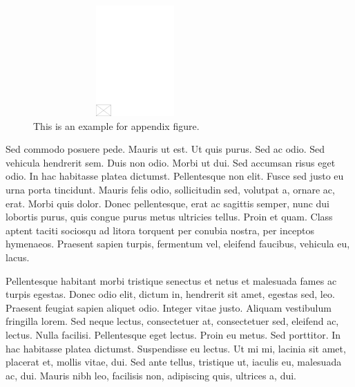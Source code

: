 \documentclass[APA,Times1COL]{WileyNJDv5} %
\begin{document}
\begin{figure}[b]
\centerline{\includegraphics[height=10pc,width=78mm,draft]{empty}}
\caption{This is an example for appendix figure.\label{fig5}}
\end{figure}


Sed commodo posuere pede. Mauris ut est. Ut quis purus. Sed ac odio. Sed vehicula hendrerit sem. Duis non odio.
Morbi ut dui. Sed accumsan risus eget odio. In hac habitasse platea dictumst. Pellentesque non elit. Fusce sed justo
eu urna porta tincidunt. Mauris felis odio, sollicitudin sed, volutpat a, ornare ac, erat. Morbi quis dolor. Donec
pellentesque, erat ac sagittis semper, nunc dui lobortis purus, quis congue purus metus ultricies tellus. Proin et quam.
Class aptent taciti sociosqu ad litora torquent per conubia nostra, per inceptos hymenaeos. Praesent sapien turpis,
fermentum vel, eleifend faucibus, vehicula eu, lacus.

Pellentesque habitant morbi tristique senectus et netus et malesuada fames ac turpis egestas. Donec odio elit,
dictum in, hendrerit sit amet, egestas sed, leo. Praesent feugiat sapien aliquet odio. Integer vitae justo. Aliquam
vestibulum fringilla lorem. Sed neque lectus, consectetuer at, consectetuer sed, eleifend ac, lectus. Nulla facilisi.
Pellentesque eget lectus. Proin eu metus. Sed porttitor. In hac habitasse platea dictumst. Suspendisse eu lectus. Ut
mi mi, lacinia sit amet, placerat et, mollis vitae, dui. Sed ante tellus, tristique ut, iaculis eu, malesuada ac, dui.
Mauris nibh leo, facilisis non, adipiscing quis, ultrices a, dui.
\end{document}
